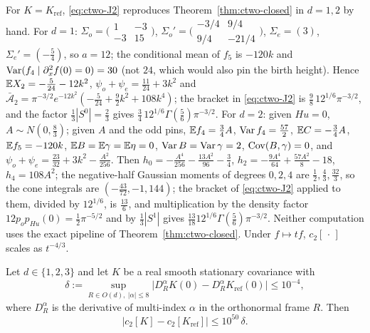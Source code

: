 \begin{remark}\label{rem:ctwo-recover}
For $K=K_{\mathrm{ref}}$, \eqref{eq:ctwo-J2} reproduces Theorem~\ref{thm:ctwo-closed} in $d=1,2$ by hand. For $d=1$: $\Sigma_o=\bigl(\begin{smallmatrix}1&-3\\-3&15\end{smallmatrix}\bigr)$, $\Sigma_o'=\bigl(\begin{smallmatrix}-3/4&9/4\\9/4&-21/4\end{smallmatrix}\bigr)$, $\Sigma_e=(3)$, $\Sigma_e'=(-\frac54)$, so $a=12$; the conditional mean of $f_5$ is $-120k$ and $\operatorname{Var}(f_4\mid\partial_x^2f(0)=0)=30$ (not $24$, which would also pin the birth height). Hence $\mathbb E X_2=-\frac5{24}-12k^2$, $\psi_o+\psi_e=\frac{11}{24}+3k^2$ and $\bar{\mathcal A}_2=\pi^{-3/2}e^{-12k^2}(-\frac5{24}+\frac92k^2+108k^4)$; the bracket in \eqref{eq:ctwo-J2} is $\frac98\,12^{1/6}\pi^{-3/2}$, and the factor $\frac13|S^0|=\frac23$ gives $\frac34\,12^{1/6}\Gamma(\frac56)\pi^{-3/2}$. For $d=2$: given $Hu=0$, $A\sim N(0,\frac83)$; given $A$ and the odd pins, $\mathbb E f_4=\frac34A$, $\operatorname{Var} f_4=\frac{57}2$, $\mathbb E C=-\frac34A$, $\mathbb E f_5=-120k$, $\mathbb E B=\mathbb E\gamma=\mathbb E\eta=0$, $\operatorname{Var} B=\operatorname{Var}\gamma=2$, $\operatorname{Cov}(B,\gamma)=0$, and $\psi_o+\psi_e=\frac{23}{32}+3k^2-\frac{A^2}{256}$. Then $h_0=-\frac{A^4}{256}-\frac{13A^2}{96}-\frac34$, $h_2=-\frac{9A^4}{64}+\frac{57A^2}8-18$, $h_4=108A^2$; the negative-half Gaussian moments of degrees $0,2,4$ are $\frac12,\frac43,\frac{32}3$, so the cone integrals are $(-\frac{43}{72},-1,144)$; the bracket of \eqref{eq:ctwo-J2} applied to them, divided by $12^{1/6}$, is $\frac{13}6$, and multiplication by the density factor $12p_op_{Hu}(0)=\frac12\pi^{-5/2}$ and by $\frac13|S^1|$ gives $\frac{13}{18}12^{1/6}\Gamma(\frac56)\pi^{-3/2}$. Neither computation uses the exact pipeline of Theorem~\ref{thm:ctwo-closed}. Under $f\mapsto tf$, $c_2[\,\cdot\,]$ scales as $t^{-4/3}$.
\end{remark}

\begin{theorem}\label{thm:ctwo-stability}
Let $d\in\{1,2,3\}$ and let $K$ be a real smooth stationary covariance with
\begin{equation}\label{eq:ctwo-J3}
\delta:=\sup_{R\in O(d),\ |\alpha|\le8}\bigl|D^\alpha_RK(0)-D^\alpha_RK_{\mathrm{ref}}(0)\bigr|\le10^{-4},
\end{equation}
where $D^\alpha_R$ is the derivative of multi-index $\alpha$ in the orthonormal frame $R$. Then
\begin{equation}\label{eq:ctwo-J4}
\bigl|c_2[K]-c_2[K_{\mathrm{ref}}]\bigr|\le10^{50}\,\delta .
\end{equation}
\end{theorem}

